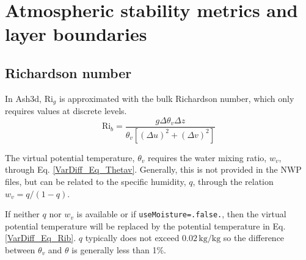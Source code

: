 %



\section{Atmospheric stability metrics and layer boundaries}
\subsection{Richardson number}

In Ash3d, $\mathrm{Ri}_g$ is approximated with the bulk Richardson number, which
only requires values at discrete levels.
\begin{equation}\label{VarDiff_Eq_Rib}
\mathrm{Ri}_b = \frac{g \Delta \theta_v \Delta z}
{\theta_v \left[ \left( \Delta u \right)^2 + \left( \Delta v \right)^2 \right]}
\end{equation}

The virtual potential temperature, $\theta_v$ requires the water mixing ratio, $w_v$,
through Eq. \ref{VarDiff_Eq_Thetav}. Generally, this is not provided
in the NWP files, but can be related to the specific humidity, $q$, through the relation
$w_v=q/(1-q)$.

If neither $q$ nor $w_v$ is available or if \texttt{useMoisture=.false.}, then
the virtual potential temperature will be replaced by the potential temperature in Eq. \ref{VarDiff_Eq_Rib}.
$q$ typically does not exceed $0.02 \, \mathrm{kg}/\mathrm{kg}$ so the difference between $\theta_v$
and $\theta$ is generally less than 1\%.

